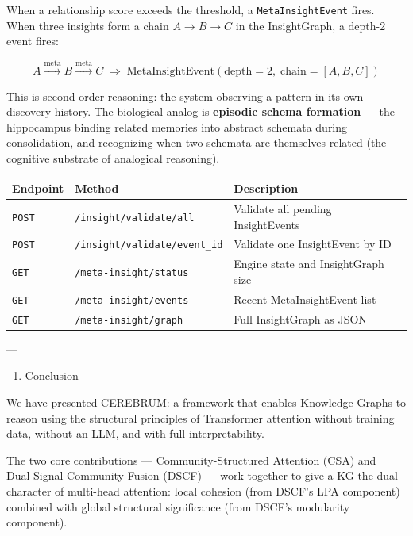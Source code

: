 \documentclass[10pt,journal,compsoc]{IEEEtran}
\begin{document}
When a relat\-ionship score exceeds the threshold, a \texttt{MetaInsightEvent} fires. When three insights form a chain $A \to B \to C$ in the InsightGraph, a depth-2 event fires:

\begin{equation}
A \xrightarrow{\text{meta}} B \xrightarrow{\text{meta}} C \;\Rightarrow\; \text{MetaInsightEvent}(\text{depth}=2,\; \text{chain}=[A, B, C])
\end{equation}

This is second-order reasoning: the system observing a pattern in its own discovery history. The biological analog is \textbf{episodic schema formation} — the hippocampus binding related memories into abstract schemata during conso\-lidation, and recognizing when two schemata are themselves related (the cognitive substrate of analogical reasoning).

\begin{center}
{\footnotesize
\begin{tabularx}{\columnwidth}{|>{\raggedright\arraybackslash}X|>{\raggedright\arraybackslash}X|>{\raggedright\arraybackslash}X|}
\hline
Endpoint & Method & Description \\ \hline
\texttt{POST} & \texttt{/insight/validate/all} & Validate all pending InsightEvents \\ \hline
\texttt{POST} & \texttt{/insight/validate/{event\_id}} & Validate one InsightEvent by ID \\ \hline
\texttt{GET} & \texttt{/meta-insight/status} & Engine state and InsightGraph size \\ \hline
\texttt{GET} & \texttt{/meta-insight/events} & Recent MetaInsightEvent list \\ \hline
\texttt{GET} & \texttt{/meta-insight/graph} & Full InsightGraph as JSON \\ \hline
\end{tabularx}
}
\end{center}

---

\begin{enumerate}
\item Conclusion

\end{enumerate}
We have presented CEREBRUM: a framework that enables Knowledge Graphs to reason using the structural principles of Transformer attention without training data, without an LLM, and with full inter\-pretability.

The two core contr\-ibutions — Community-Structured Attention (CSA) and Dual-Signal Community Fusion (DSCF) — work together to give a KG the dual character of multi-head attention: local cohesion (from DSCF's LPA component) combined with global structural signi\-ficance (from DSCF's modularity component).
\end{document}
